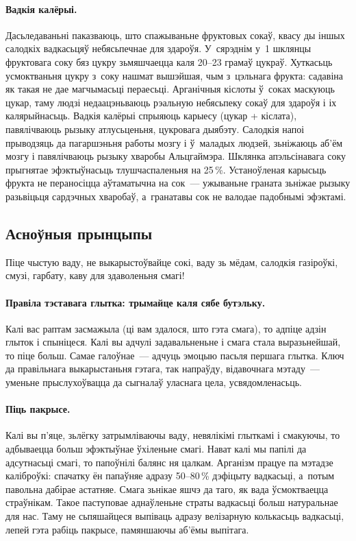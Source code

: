\paragraph{Вадкія калёрыі.}
Дасьледаваньні паказваюць, што спажываньне фруктовых сокаў, квасу ды іншых салодкіх вадкасьцяў небясьпечнае для здароўя. У~сярэднім у~1 шклянцы фруктовага соку бяз цукру зьмяшчаецца каля 20--23 грамаў цукраў. Хуткасьць усмоктваньня цукру з~соку нашмат вышэйшая, чым з~цэльнага фрукта: садавіна як такая не дае магчымасьці пераесьці. Арганічныя кіслоты ў~соках маскуюць цукар, таму людзі недаацэньваюць рэальную небясьпеку сокаў для здароўя і іх калярыйнасьць. Вадкія калёрыі спрыяюць карыесу (цукар + кіслата), павялічваюць рызыку атлусьценьня, цукровага дыябэту. Салодкія напоі прыводзяць да пагаршэньня работы мозгу і ў~маладых людзей, зьніжаюць аб'ём мозгу і павялічваюць рызыку хваробы Альцгаймэра. Шклянка апэльсінавага соку прыгнятае эфэктыўнасьць тлушчаспаленьня на 25\,\%. Устаноўленая карысьць фрукта не пераносіцца аўтаматычна на сок~--- ужываньне граната зьніжае рызыку разьвіцьця сардэчных хваробаў, а~гранатавы сок не валодае падобнымі эфэктамі.

\subsection{Асноўныя прынцыпы}

Піце чыстую ваду, не выкарыстоўвайце сокі, ваду зь мёдам, салодкія газіроўкі, смузі, гарбату, каву для здаволеньня смагі!

\paragraph{Правіла тэставага глытка: трымайце каля сябе бутэльку.}
Калі вас раптам засмажыла (ці вам здалося, што гэта смага), то адпіце адзін глыток і спыніцеся. Калі вы адчулі задавальненьне і смага стала выразьнейшай, то піце больш. Самае галоўнае~--- адчуць эмоцыю пасьля першага глытка. Ключ да правільнага выкарыстаньня гэтага, так напраўду, відавочнага мэтаду~--- уменьне прыслухоўвацца да сыгналаў уласнага цела, усвядомленасьць.


\paragraph{Піць пакрысе.}
Калі вы п'яце, зьлёгку затрымліваючы ваду, невялікімі глыткамі і смакуючы, то адбываецца больш эфэктыўнае ўхіленьне смагі. Нават калі мы папілі да адсутнасьці смагі, то папоўнілі балянс ня цалкам. Арганізм працуе па мэтадзе каліброўкі: спачатку ён папаўняе адразу 50--80\,\% дэфіцыту вадкасьці, а~потым павольна дабірае астатняе. Смага зьнікае яшчэ да таго, як вада ўсмоктваецца страўнікам. Такое паступовае аднаўленьне страты вадкасьці больш натуральнае для нас. Таму не сьпяшайцеся выпіваць адразу велізарную колькасьць вадкасьці, лепей гэта рабіць пакрысе, памяншаючы аб'ёмы выпітага.

